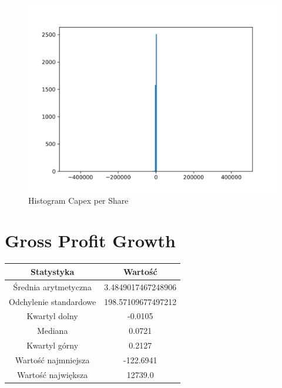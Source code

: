 \documentclass{article}
\begin{document}
\begin{figure}[h!]
    \includegraphics[width=\linewidth]{variables/Capex per Share.png}
    \caption{Histogram Capex per Share }
\end{figure}\section{ Gross Profit Growth }

\begin{center}
    \begin{tabular}{|c | c|} 
    \hline
    Statystyka & Wartość \\
    \hline\hline
    Średnia arytmetyczna & 3.4849017467248906 \\ 
    \hline
    Odchylenie standardowe & 198.57109677497212 \\
    \hline
    Kwartyl dolny & -0.0105 \\
    \hline
    Mediana & 0.0721 \\
    \hline
    Kwartyl górny & 0.2127 \\
    \hline
    Wartość najmniejsza & -122.6941 \\
    \hline
    Wartość największa & 12739.0 \\
    \hline
   \end{tabular}
\end{center}
\end{document}

